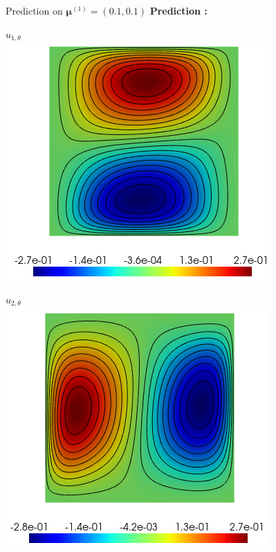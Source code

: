 \begin{frame}{Prediction on $\bm{\mu}^{(1)} = (0.1,0.1)$}
    \vspace{-4pt}
    \textbf{Prediction :} \begin{minipage}{0.26\linewidth}
        \centering
        $u_{1,\theta}$ \\
        \includegraphics[width=0.95\linewidth]{images/pinn/training/PINN_plot_case4_v2_param1_u1.png}
    \end{minipage} \; \begin{minipage}{0.26\linewidth}
        \centering
        $u_{2,\theta}$ \\
        \includegraphics[width=0.95\linewidth]{images/pinn/training/PINN_plot_case4_v2_param1_u2.png}

\end{minipage}
\end{frame}
